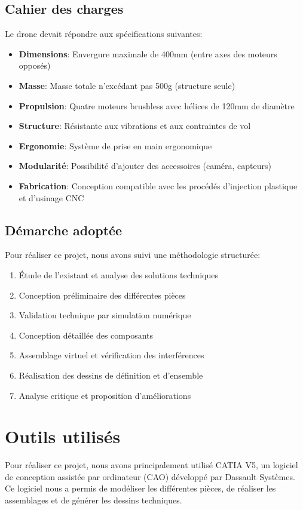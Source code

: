 \documentclass[a4paper,12pt]{report}
\begin{document}
\subsection{Cahier des charges}
Le drone devait répondre aux spécifications suivantes:
\begin{itemize}
    \item \textbf{Dimensions}: Envergure maximale de 400mm (entre axes des moteurs opposés)
    \item \textbf{Masse}: Masse totale n'excédant pas 500g (structure seule)
    \item \textbf{Propulsion}: Quatre moteurs brushless avec hélices de 120mm de diamètre
    \item \textbf{Structure}: Résistante aux vibrations et aux contraintes de vol
    \item \textbf{Ergonomie}: Système de prise en main ergonomique
    \item \textbf{Modularité}: Possibilité d'ajouter des accessoires (caméra, capteurs)
    \item \textbf{Fabrication}: Conception compatible avec les procédés d'injection plastique et d'usinage CNC
\end{itemize}

\subsection{Démarche adoptée}
Pour réaliser ce projet, nous avons suivi une méthodologie structurée:
\begin{enumerate}
    \item Étude de l'existant et analyse des solutions techniques
    \item Conception préliminaire des différentes pièces
    \item Validation technique par simulation numérique
    \item Conception détaillée des composants
    \item Assemblage virtuel et vérification des interférences
    \item Réalisation des dessins de définition et d'ensemble
    \item Analyse critique et proposition d'améliorations
\end{enumerate}

\section{Outils utilisés}
Pour réaliser ce projet, nous avons principalement utilisé CATIA V5, un logiciel de conception assistée par ordinateur (CAO) développé par Dassault Systèmes. Ce logiciel nous a permis de modéliser les différentes pièces, de réaliser les assemblages et de générer les dessins techniques.
\end{document}
